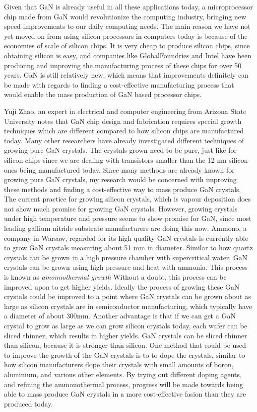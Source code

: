\documentclass[letterpaper]{letter}
\begin{document}
\begin{letter}
Given that GaN is already useful in all these applications today, a
microprocessor chip made from GaN would revolutionize the computing industry,
bringing new speed improvements to our daily computing needs. The main reason
we have not yet moved on from using silicon processors in computers today is
because of the economies of scale of silicon chips. It is very cheap to produce
silicon chips, since obtaining silicon is easy, and companies like
GlobalFoundries and Intel have been producing and improving the manufacturing
process of these chips for over 50 years. GaN is still relatively new,
which means that improvements definitely can be made with regards to finding a
cost-effective manufacturing process that would enable the mass production of GaN
based processor chips.


Yuji Zhao, an expert in electrical and computer engineering from Arizona State
University %
notes that GaN chip design and fabrication requires special growth techniques
which are different compared to how silicon chips are manufactured today. Many
other researchers have already investigated different techniques of growing pure
GaN crystals. The crystals grown need to be pure, just like for silicon chips
since we are dealing with transistors smaller than the 12 nm silicon ones being
manufactured today. Since many methods are already known for growing pure GaN
crystals, my research would be concerned with improving these methods and
finding a cost-effective way to mass produce GaN crystals. The current practice
for growing silicon crystals, which is vapour deposition does not show much
promise for growing GaN crystals. However, growing crystals under high
temperature and pressure seems to show promise for GaN, since most leading
gallium nitride substrate manufacturers are doing this now. Ammono, a company in
Warsaw, regarded for its high quality GaN crystals is currently able to grow GaN
crystals measuring about 51 mm in diameter. Similar to how quartz crystals can
be grown in a high pressure chamber with supercritical water, GaN crystals can
be grown using high pressure and heat with ammonia. This process is known as \textit{amonnothermal growth} Without a doubt, this
process can be improved upon to get higher yields. Ideally  the process of
growing these GaN crystals could be improved to a point where GaN crystals can
be grown about as large as silicon crystals are in semiconductor manufacturing, which
typically have a diameter of about 300mm. Another advantage is that if we can get a GaN crystal to
grow as large as we can grow silicon crystals today, each wafer can be
sliced thinner, which results in higher yields. GaN crystals can be sliced thinner than silicon,
because it is stronger than silicon. One method that could be used to improve the growth of the
GaN crystals is to  to dope the crystals, similar to how silicon manufacturers dope
their crystals with small amounts of boron, aluminium, and various other elements.
By trying out different doping agents, and refining the ammonothermal process,
progress will be made towards being able to mass produce GaN crystals in a more
cost-effective fasion than they are produced today.




\end{letter}
\end{document}
